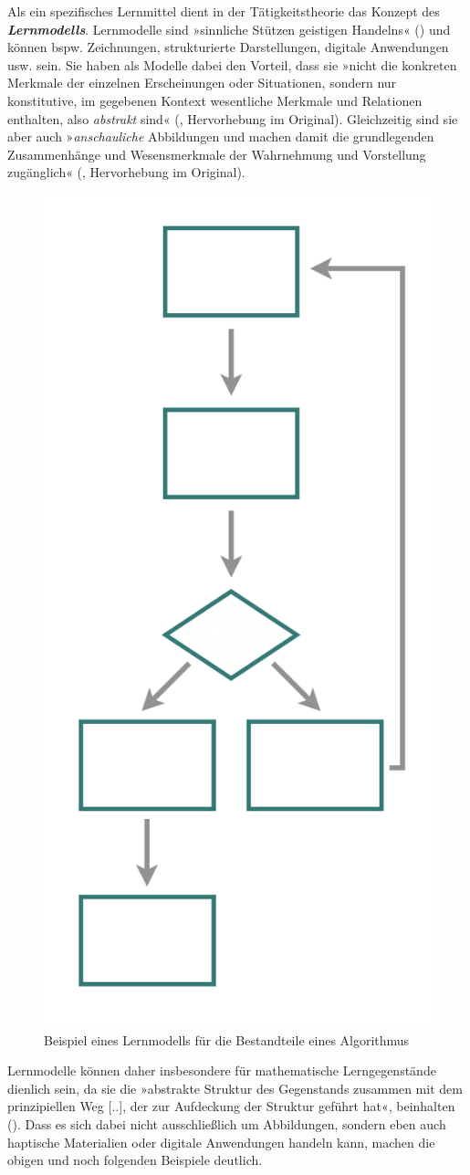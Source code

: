 \documentclass[
]{scrbook}
\theoremstyle{definition}
\theoremstyle{definition}
\theoremstyle{definition}
\theoremstyle{definition}
\theoremstyle{remark}
\begin{document}
Als ein spezifisches Lernmittel dient in der Tätigkeitstheorie das Konzept des \textbf{\emph{Lernmodells}}. Lernmodelle sind »sinnliche Stützen geistigen Handelns« () und können bspw. Zeichnungen, strukturierte Darstellungen, digitale Anwendungen usw. sein. Sie haben als Modelle dabei den Vorteil, dass sie »nicht die konkreten Merkmale der einzelnen Erscheinungen oder Situationen, sondern nur konstitutive, im gegebenen Kontext wesentliche Merkmale und Relationen enthalten, also \emph{abstrakt} sind« (, Hervorhebung im Original). Gleichzeitig sind sie aber auch »\emph{anschauliche} Abbildungen und machen damit die grundlegenden Zusammenhänge und Wesensmerkmale der Wahrnehmung und Vorstellung zugänglich« (, Hervorhebung im Original).

\begin{figure}

{\centering \includegraphics[width=0.25\linewidth]{pictures/8-Lernmodell} 

}

\caption{Beispiel eines Lernmodells für die Bestandteile eines Algorithmus}\label{fig:LernmodellAlgorithmus}
\end{figure}

Lernmodelle können daher insbesondere für mathematische Lerngegenstände dienlich sein, da sie die »abstrakte Struktur des Gegenstands zusammen mit dem prinzipiellen Weg {[}..{]}, der zur Aufdeckung der Struktur geführt hat«, beinhalten (). Dass es sich dabei nicht ausschließlich um Abbildungen, sondern eben auch haptische Materialien oder digitale Anwendungen handeln kann, machen die obigen und noch folgenden Beispiele deutlich.
\end{document}
